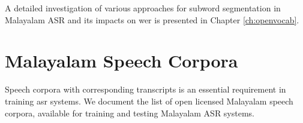 A detailed investigation of various approaches for subword segmentation in Malayalam ASR and its impacts on \gls{wer} is presented in Chapter \ref{ch:openvocab}.







\section{Malayalam Speech Corpora} \label{sec:Literature-corpora}


Speech corpora with corresponding transcripts is an essential requirement in
training \gls{asr} systems. We document the list of open licensed
Malayalam speech corpora, available for training and testing Malayalam ASR
systems.

